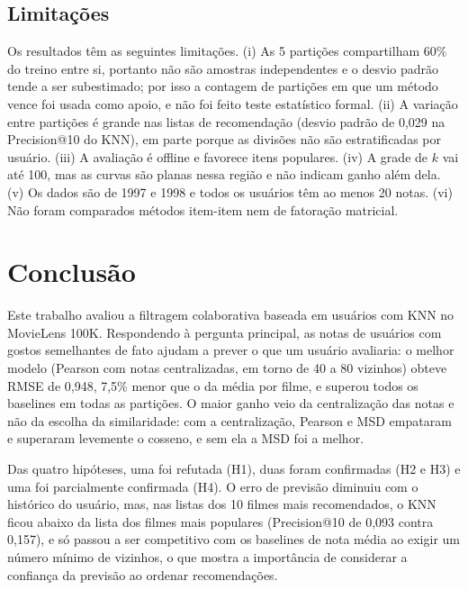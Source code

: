 \documentclass[conference]{IEEEtran}
\begin{document}
\subsection{Limita\c{c}\~oes}
Os resultados t\^em as seguintes limita\c{c}\~oes. (i) As 5 parti\c{c}\~oes compartilham 60\% do treino entre si, portanto n\~ao s\~ao amostras independentes e o desvio padr\~ao tende a ser subestimado; por isso a contagem de parti\c{c}\~oes em que um m\'etodo vence foi usada como apoio, e n\~ao foi feito teste estat\'istico formal. (ii) A varia\c{c}\~ao entre parti\c{c}\~oes \'e grande nas listas de recomenda\c{c}\~ao (desvio padr\~ao de 0,029 na Precision@10 do KNN), em parte porque as divis\~oes n\~ao s\~ao estratificadas por usu\'ario. (iii) A avalia\c{c}\~ao \'e offline e favorece itens populares. (iv) A grade de $k$ vai at\'e 100, mas as curvas s\~ao planas nessa regi\~ao e n\~ao indicam ganho al\'em dela. (v) Os dados s\~ao de 1997 e 1998 e todos os usu\'arios t\^em ao menos 20 notas. (vi) N\~ao foram comparados m\'etodos item-item nem de fatora\c{c}\~ao matricial.

\section{Conclus\~ao}
Este trabalho avaliou a filtragem colaborativa baseada em usu\'arios com KNN no MovieLens 100K. Respondendo \`a pergunta principal, as notas de usu\'arios com gostos semelhantes de fato ajudam a prever o que um usu\'ario avaliaria: o melhor modelo (Pearson com notas centralizadas, em torno de 40 a 80 vizinhos) obteve RMSE de 0,948, 7,5\% menor que o da m\'edia por filme, e superou todos os baselines em todas as parti\c{c}\~oes. O maior ganho veio da centraliza\c{c}\~ao das notas e n\~ao da escolha da similaridade: com a centraliza\c{c}\~ao, Pearson e MSD empataram e superaram levemente o cosseno, e sem ela a MSD foi a melhor.

Das quatro hip\'oteses, uma foi refutada (H1), duas foram confirmadas (H2 e H3) e uma foi parcialmente confirmada (H4). O erro de previs\~ao diminuiu com o hist\'orico do usu\'ario, mas, nas listas dos 10 filmes mais recomendados, o KNN ficou abaixo da lista dos filmes mais populares (Precision@10 de 0,093 contra 0,157), e s\'o passou a ser competitivo com os baselines de nota m\'edia ao exigir um n\'umero m\'inimo de vizinhos, o que mostra a import\^ancia de considerar a confian\c{c}a da previs\~ao ao ordenar recomenda\c{c}\~oes.
\end{document}
